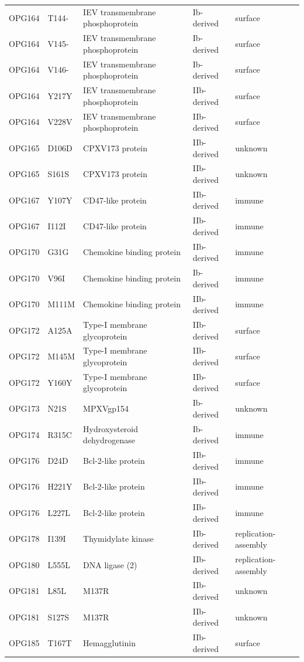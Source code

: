 \documentclass[11pt]{article}
\begin{document}
\begin{longtable}{lllll}
OPG164 & T144- & IEV transmembrane phosphoprotein & Ib-derived & surface \\
OPG164 & V145- & IEV transmembrane phosphoprotein & Ib-derived & surface \\
OPG164 & V146- & IEV transmembrane phosphoprotein & Ib-derived & surface \\
OPG164 & Y217Y & IEV transmembrane phosphoprotein & IIb-derived & surface \\
OPG164 & V228V & IEV transmembrane phosphoprotein & IIb-derived & surface \\
OPG165 & D106D & CPXV173 protein & IIb-derived & unknown \\
OPG165 & S161S & CPXV173 protein & IIb-derived & unknown \\
OPG167 & Y107Y & CD47-like protein & IIb-derived & immune \\
OPG167 & I112I & CD47-like protein & IIb-derived & immune \\
OPG170 & G31G & Chemokine binding protein & IIb-derived & immune \\
OPG170 & V96I & Chemokine binding protein & Ib-derived & immune \\
OPG170 & M111M & Chemokine binding protein & IIb-derived & immune \\
OPG172 & A125A & Type-I membrane glycoprotein & IIb-derived & surface \\
OPG172 & M145M & Type-I membrane glycoprotein & IIb-derived & surface \\
OPG172 & Y160Y & Type-I membrane glycoprotein & IIb-derived & surface \\
OPG173 & N21S & MPXVgp154 & Ib-derived & unknown \\
OPG174 & R315C & Hydroxysteroid dehydrogenase & Ib-derived & immune \\
OPG176 & D24D & Bcl-2-like protein & IIb-derived & immune \\
OPG176 & H221Y & Bcl-2-like protein & IIb-derived & immune \\
OPG176 & L227L & Bcl-2-like protein & IIb-derived & immune \\
OPG178 & I139I & Thymidylate kinase & IIb-derived & replication-assembly \\
OPG180 & L555L & DNA ligase (2) & IIb-derived & replication-assembly \\
OPG181 & L85L & M137R & IIb-derived & unknown \\
OPG181 & S127S & M137R & IIb-derived & unknown \\
OPG185 & T167T & Hemagglutinin & IIb-derived & surface \\

\end{longtable}
\end{document}
